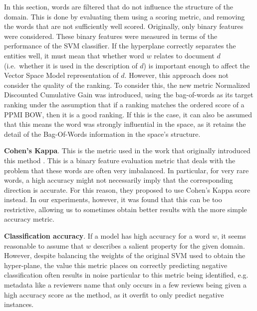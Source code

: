 In this section, words are filtered that do not influence the structure of the domain. This is done by evaluating them using a scoring metric, and removing the words that are not sufficiently well scored. Originally, only binary features were considered. These binary features were measured  in terms of the performance of the SVM classifier.  If the hyperplane correctly separates the entities well, it must mean that whether word $w$ relates to document $d$ (i.e.\ whether it is used in the description of $d$) is important enough to affect the Vector Space Model representation of $d$.  However, this approach does not consider the quality of the ranking. To consider this, the new metric Normalized Discounted Cumulative Gain was introduced, using the bag-of-words as its target ranking under the assumption that if a ranking matches the ordered score of a PPMI BOW, then it is a good ranking. If this is the case, it can also be assumed that this means the word was strongly influential in the space, as it retains the detail of the Bag-Of-Words information in the space's structure. 

\noindent

\noindent \textbf{Cohen's Kappa}. This is the metric used in the work that originally introduced this method \cite{Derrac2015}. This is a binary feature evaluation metric that deals with the problem that these words are often very imbalanced. In particular, for very rare words, a high accuracy might not necessarily imply that the corresponding direction is accurate. For this reason, they proposed to use Cohen's Kappa score instead. In our experiments, however, it was found that this can be too restrictive, allowing us to sometimes obtain better results with the more simple accuracy metric.\smallskip %


 \textbf{Classification accuracy}. If a model has high accuracy for a word $w$, it seems reasonable to assume that $w$ describes a salient property for the given domain. However, despite balancing the weights of the original SVM used to obtain the hyper-plane, the value this metric places on correctly predicting negative classification often results in noise particular to this metric being identified, e.g. metadata like a reviewers name that only occurs in a few reviews being given a high accuracy score as the method, as it overfit to only predict negative instances.%
\smallskip



